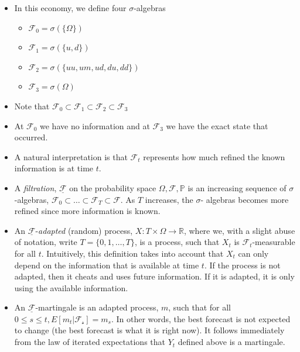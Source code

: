 \documentclass[11pt]{article}
\begin{document}
\begin{itemize}
    \item In this economy, we define four $\sigma$-algebras
    \begin{itemize}
        \item $\mathcal{F}_0 = \sigma(\{\Omega\})$
        \item $\mathcal{F}_1 = \sigma(\{u,d\})$
        \item $\mathcal{F}_2 = \sigma(\{uu, um, ud, du, dd\})$
        \item $\mathcal{F}_3 = \sigma(\Omega)$
    \end{itemize}
    \item Note that $\mathcal{F}_0 \subset \mathcal{F}_1 \subset \mathcal{F}_2 \subset 
    \mathcal{F}_3$ 
    \item At $\mathcal{F}_0$ we have no information and at $\mathcal{F}_3$ we have the exact 
    state that occurred. 
    \item A natural interpretation is that $\mathcal{F}_t$ represents how much refined 
    the known information is at time $t$.
    \item A \textit{filtration}, $\underline{\mathcal{F}}$ on the probability space $\Omega, 
    \mathcal{F}, \mathbb{P}$ is an increasing sequence of $\sigma$-algebras, $\mathcal{F}_0 
    \subset \hdots \subset \mathcal{F}_T \subset \mathcal{F}$. As $T$ increases, the $\sigma$-
    algebras becomes more refined since more information is known. 
    \item An $\underline{\mathcal{F}}$-\textit{adapted} (random) process, $X: T \times \Omega 
    \rightarrow \mathbb{R}$, where we, with a slight abuse of notation, write $T=\{0,1,\ldots,
    T\}$, is a process, such that $X_t$ is $\mathcal{F}_t$-measurable for all $t$. 
    Intuitively, this definition takes into account that $X_t$ can only depend on the 
    information that is available at time $t$. If the process is not adapted, then it cheats 
    and uses future information. If it is adapted, it is only using the available information.
    \item An $\underline{\mathcal{F}}$-martingale is an adapted process, $m$, such that for all 
    $0 \le s \le t, E[m_t|\mathcal{F_s}]=m_s$. In other words, the best forecast is not expected 
    to change (the best forecast is what it is right now). It follows immediately from the law 
    of iterated expectations that $Y_t$ defined above is a martingale. 
\end{itemize}
\end{document}
